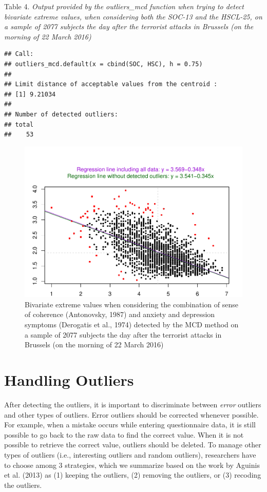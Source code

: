 \documentclass[man,floatsintext]{apa6}
\begin{document}
Table 4.
\emph{Output provided by the outliers\_mcd function when trying to detect bivariate extreme values, when considering both the SOC-13 and the HSCL-25, on a sample of 2077 subjects the day after the terrorist attacks in Brussels (on the morning of 22 March 2016)}

\begin{verbatim}
## Call:
## outliers_mcd.default(x = cbind(SOC, HSC), h = 0.75)
## 
## Limit distance of acceptable values from the centroid :
## [1] 9.21034
## 
## Number of detected outliers:
## total 
##    53
\end{verbatim}

\begin{figure}
\centering
\includegraphics{Outliers_files/figure-latex/MCDSOC-1.pdf}
\caption{\label{fig:MCDSOC}Bivariate extreme values when considering the combination of sense of coherence (Antonovsky, 1987) and anxiety and depression symptoms (Derogatis et al., 1974) detected by the MCD method on a sample of 2077 subjects the day after the terrorist attacks in Brussels (on the morning of 22 March 2016)}
\end{figure}

\hypertarget{handling-outliers}{%
\section{Handling Outliers}\label{handling-outliers}}

After detecting the outliers, it is important to discriminate between \emph{error} outliers and other types of outliers. Error outliers should be corrected whenever possible. For example, when a mistake occurs while entering questionnaire data, it is still possible to go back to the raw data to find the correct value. When it is not possible to retrieve the correct value, outliers should be deleted. To manage other types of outliers (i.e., interesting outliers and random outliers), researchers have to choose among 3 strategies, which we summarize based on the work by Aguinis et al. (2013) as (1) keeping the outliers, (2) removing the outliers, or (3) recoding the outliers.
\end{document}
